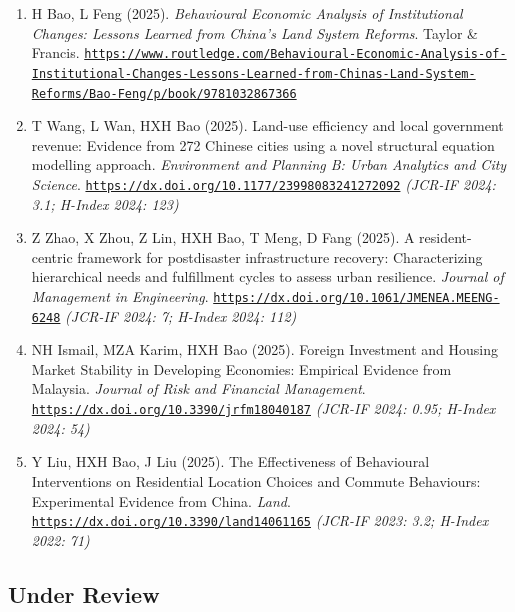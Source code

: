 \documentclass[10pt,a4paper]{article}
\providecommand{\tightlist}{%
  \setlength{\itemsep}{2pt}\setlength{\parskip}{0pt}}
\begin{document}
\begin{enumerate}
\def\labelenumi{\arabic{enumi}.}
\tightlist
\item
  H Bao, L Feng (2025). \emph{Behavioural Economic Analysis of
  Institutional Changes: Lessons Learned from China's Land System
  Reforms}. Taylor \& Francis.
  \href{https://www.routledge.com/Behavioural-Economic-Analysis-of-Institutional-Changes-Lessons-Learned-from-Chinas-Land-System-Reforms/Bao-Feng/p/book/9781032867366}{\nolinkurl{https://www.routledge.com/Behavioural-Economic-Analysis-of-Institutional-Changes-Lessons-Learned-from-Chinas-Land-System-Reforms/Bao-Feng/p/book/9781032867366}}
\item
  T Wang, L Wan, HXH Bao (2025). Land-use efficiency and local
  government revenue: Evidence from 272 Chinese cities using a novel
  structural equation modelling approach. \emph{Environment and Planning
  B: Urban Analytics and City Science}.
  \href{https://dx.doi.org/10.1177/23998083241272092}{\nolinkurl{https://dx.doi.org/10.1177/23998083241272092}}
  \emph{(JCR-IF 2024: 3.1; H-Index 2024: 123)}
\item
  Z Zhao, X Zhou, Z Lin, HXH Bao, T Meng, D Fang (2025). A
  resident-centric framework for postdisaster infrastructure recovery:
  Characterizing hierarchical needs and fulfillment cycles to assess
  urban resilience. \emph{Journal of Management in Engineering}.
  \href{https://dx.doi.org/10.1061/JMENEA.MEENG-6248}{\nolinkurl{https://dx.doi.org/10.1061/JMENEA.MEENG-6248}}
  \emph{(JCR-IF 2024: 7; H-Index 2024: 112)}
\item
  NH Ismail, MZA Karim, HXH Bao (2025). Foreign Investment and Housing
  Market Stability in Developing Economies: Empirical Evidence from
  Malaysia. \emph{Journal of Risk and Financial Management}.
  \href{https://dx.doi.org/10.3390/jrfm18040187}{\nolinkurl{https://dx.doi.org/10.3390/jrfm18040187}}
  \emph{(JCR-IF 2024: 0.95; H-Index 2024: 54)}
\item
  Y Liu, HXH Bao, J Liu (2025). The Effectiveness of Behavioural
  Interventions on Residential Location Choices and Commute Behaviours:
  Experimental Evidence from China. \emph{Land}.
  \href{https://dx.doi.org/10.3390/land14061165}{\nolinkurl{https://dx.doi.org/10.3390/land14061165}}
  \emph{(JCR-IF 2023: 3.2; H-Index 2022: 71)}
\end{enumerate}

\newpage

\subsection{Under Review}\label{under-review}
\end{document}
